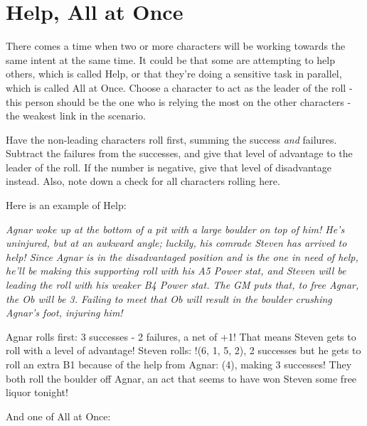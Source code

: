 \documentclass[../main.tex]{subfiles}
\begin{document}
    \section{Help, All at Once}

        There comes a time when two or more characters will be working towards the same intent at the same time. It could be that some are attempting to help others, which is called Help, or that they're doing a sensitive task in parallel, which is called All at Once. Choose a character to act as the leader of the roll - this person should be the one who is relying the most on the other characters - the weakest link in the scenario.

        Have the non-leading characters roll first, summing the success {\em and} failures. Subtract the failures from the successes, and give that level of advantage to the leader of the roll. If the number is negative, give that level of disadvantage instead. Also, note down a check for all characters rolling here.

        Here is an example of Help:

        \begin{displayquote}
            {\em Agnar woke up at the bottom of a pit with a large boulder on top of him! He's uninjured, but at an awkward angle; luckily, his comrade Steven has arrived to help! Since Agnar is in the disadvantaged position and is the one in need of help, he'll be making this supporting roll with his A5 Power stat, and Steven will be leading the roll with his weaker B4 Power stat. The GM puts that, to free Agnar, the Ob will be 3. Failing to meet that Ob will result in the boulder crushing Agnar's foot, injuring him!

            Agnar rolls first: 3 successes - 2 failures, a net of +1! That means Steven gets to roll with a level of advantage! Steven rolls: !(6, 1, 5, 2), 2 successes but he gets to roll an extra B1 because of the help from Agnar: (4), making 3 successes! They both roll the boulder off Agnar, an act that seems to have won Steven some free liquor tonight!}
        \end{displayquote}

        And one of All at Once:
\end{document}
